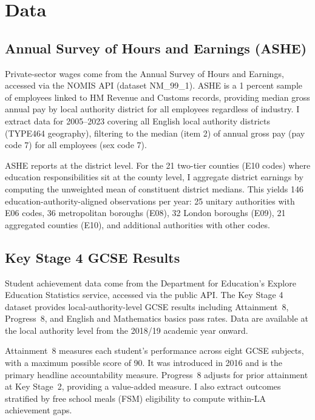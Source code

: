 \documentclass[12pt]{article}
\begin{document}
\section{Data}\label{sec:data}

\subsection{Annual Survey of Hours and Earnings (ASHE)}

Private-sector wages come from the Annual Survey of Hours and Earnings, accessed via the NOMIS API (dataset NM\_99\_1). ASHE is a 1 percent sample of employees linked to HM Revenue and Customs records, providing median gross annual pay by local authority district for all employees regardless of industry. I extract data for 2005--2023 covering all English local authority districts (TYPE464 geography), filtering to the median (item 2) of annual gross pay (pay code 7) for all employees (sex code 7).

ASHE reports at the district level. For the 21 two-tier counties (E10 codes) where education responsibilities sit at the county level, I aggregate district earnings by computing the unweighted mean of constituent district medians. This yields 146 education-authority-aligned observations per year: 25 unitary authorities with E06 codes, 36 metropolitan boroughs (E08), 32 London boroughs (E09), 21 aggregated counties (E10), and additional authorities with other codes.

\subsection{Key Stage 4 GCSE Results}

Student achievement data come from the Department for Education's Explore Education Statistics service, accessed via the public API. The Key Stage 4 dataset provides local-authority-level GCSE results including Attainment~8, Progress~8, and English and Mathematics basics pass rates. Data are available at the local authority level from the 2018/19 academic year onward.

Attainment~8 measures each student's performance across eight GCSE subjects, with a maximum possible score of 90. It was introduced in 2016 and is the primary headline accountability measure. Progress~8 adjusts for prior attainment at Key Stage~2, providing a value-added measure. I also extract outcomes stratified by free school meals (FSM) eligibility to compute within-LA achievement gaps.
\end{document}
